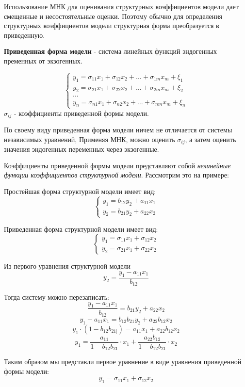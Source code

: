 \documentclass[aps,%
12pt,%
final,%
oneside,
onecolumn,%
musixtex, %
superscriptaddress,%
centertags]{article} %
\theoremstyle{plain}
\theoremstyle{definition}
\theoremstyle{remark}
\begin{document}
Использование МНК для оценивания структурных коэффициентов модели дает смещенные и несостоятельные оценки. Поэтому
обычно для определения структурных коэффициентов модели структурная форма преобразуется в приведенную.

\textbf{Приведенная форма модели} - система линейных функций эндогенных пременных от экзогенных.

$$\left \{
\begin{matrix}
	y_1 = \sigma_{11}x_1 + \sigma_{12}x_2 + \ldots + \sigma_{1m}x_m + \xi_1 \\[0.3cm]
	y_2 =\sigma_{21}x_1 + \sigma_{22}x_2 + \ldots + \sigma_{2m}x_m + \xi_2  \\[0.3cm]
	\ldots \\
	y_n = \sigma_{n1}x_1 + \sigma_{n2}x_2 + \ldots + \sigma_{nm}x_m + \xi_n 
\end{matrix}
\right.
$$
$\sigma_{ij}$ - коэффициенты приведенной формы модели.

По своему виду приведенная форма модели ничем не отличается от системы независимых уравнений, Применяя МНК, можно оценить $\sigma_{ij}$, а затем оценить значения эндогенных переменных через экзогенные.

Коэффициенты приведенной формы модели представляют собой \textit{нелинейные функции коэффициентов структурной модели}. Рассмотрим это на примере:

Простейшая форма структурной модели имеет вид:
$$\left \{
\begin{matrix}
	y_1 = b_{12}y_2 + a_{11}x_1\\
	y_2 = b_{21}y_2 + a_{22}x_2
\end{matrix}
\right.
$$

Приведенная форма структурной модели имеет вид:
$$\left \{
\begin{matrix}
	y_1 = \sigma_{11}x_1 + \sigma_{12}x_2\\
	y_2 = \sigma_{21}x_1 + \sigma_{22}x_2
\end{matrix}
\right.
$$

Из первого уравнения структурной модели
$$y_2 = \frac{y_1-a_{11}x_1}{b_{12}}$$

Тогда систему можно перезаписать:
$$ \frac{y_1-a_{11}x_1}{b_{12}} =  b_{21}y_2 + a_{22}x_2$$
$$y_1 - a_{11}x_1 = b_{12}b_{21}y_2 + a_{22}b_{12}x_2$$
$$y_1 \cdot (1-b_{12}b_{21]}) = a_{11}x_1 + a_{22}b_{12}x_2$$
$$y_1 = \frac{a_{11}}{1-b_{12}b_{21}}\cdot x_1 + \frac{ a_{22}b_{12}}{1-b_{12}b_{21}}\cdot x_2$$

Таким образом мы представли первое уравнение в виде уравнения приведенной формы модели:
$$y_1 = \sigma_{11}x_1 + \sigma_{12}x_2$$
\end{document}
